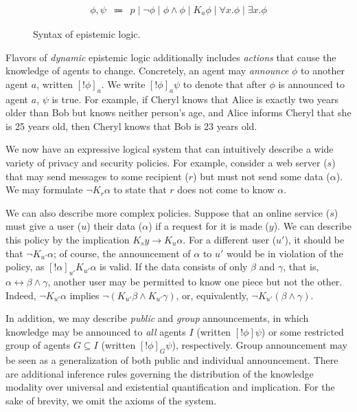\documentclass[letterpaper,twocolumn,10pt]{article}
\begin{document}
\begin{figure}[ht]
  \centering
  \[\begin{array}{rcl}
    \phi, \psi & \Coloneqq &
      p \mid
      \lnot \phi \mid
      \phi \land \phi \mid
      K_a \phi \mid
      \forall x. \phi \mid
      \exists x. \phi
  \end{array}\]
  \caption{Syntax of epistemic logic.}
  \label{fig:epistemic-logic}
\end{figure}

Flavors of \emph{dynamic} epistemic logic additionally includes \emph{actions} that cause the
knowledge of agents to change. Concretely, an agent may \emph{announce} \(\phi\) to another agent
\(a\), written \([!\phi]_{a}\). We write \([!\phi]_{a} \psi\) to denote that after \(\phi\) is
announced to agent \(a\), \(\psi\) is true. For example, if Cheryl knows that Alice is exactly two
years older than Bob but knows neither person's age, and Alice informs Cheryl that she is 25 years
old, then Cheryl knows that Bob is 23 years old.

We now have an expressive logical system that can intuitively describe a wide variety of privacy and
security policies. For example, consider a web server (\(s\)) that may send messages to some
recipient (\(r\)) but must not send some data (\(\alpha\)). We may formulate \(\lnot K_r \alpha\) to
state that \(r\) does not come to know \(\alpha\).

We can also describe more complex policies. Suppose that an online service (\(s\)) must give a user
(\(u\)) their data (\(\alpha\)) if a request for it is made (\(y\)). We can describe this policy by
the implication \(K_s y \to K_u \alpha\). For a different user (\(u'\)), it should be that \(\lnot
K_{u'} \alpha\); of course, the announcement of \(\alpha\) to \(u'\) would be in violation of the
policy, as \([!\alpha]_{u'} K_{u'} \alpha\) is valid. If the data consists of only \(\beta\) and
\(\gamma\), that is, \(\alpha \leftrightarrow \beta \land \gamma\), another user may be permitted to
know one piece but not the other. Indeed, \(\lnot K_{u'} \alpha\) implies \(\lnot (K_{u'} \beta
\land K_{u'} \gamma)\), or, equivalently, \(\lnot K_{u'} (\beta \land \gamma)\).

In addition, we may describe \emph{public} and \emph{group} announcements, in which knowledge may be
announced to \emph{all} agents \(I\) (written \([!\phi] \psi\)) or some restricted group of agents
\(G \subseteq I\) (written \([!\phi]_G \psi\)), respectively. Group announcement may be seen as a
generalization of both public and individual announcement. There are additional inference rules
governing the distribution of the knowledge modality over universal and existential quantification
and implication. For the sake of brevity, we omit the axioms of the system.
\end{document}
